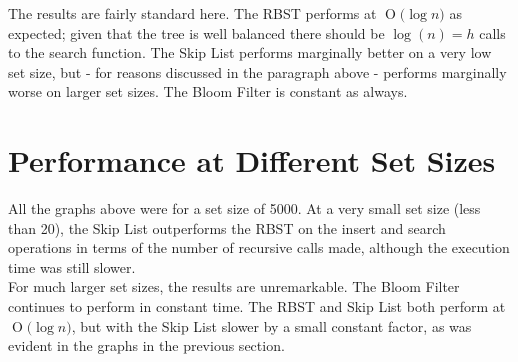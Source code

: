 \documentclass[11pt, notitlepage]{report}
\newcommand{\BigO}[1]{\ensuremath{\operatorname{O}\bigl(#1\bigr)}}
\begin{document}
The results are fairly standard here. The RBST performs at \BigO{\log n} as expected; given that the tree is well balanced there should be $\log(n) = h$ calls to the search function. The Skip List performs marginally better on a very low set size, but - for reasons discussed in the paragraph above - performs marginally worse on larger set sizes. The Bloom Filter is constant as always. 


\section*{Performance at Different Set Sizes}

All the graphs above were for a set size of 5000. At a very small set size (less than 20), the Skip List outperforms the RBST on the insert and search operations in terms of the number of recursive calls made, although the execution time was still slower.\\

For much larger set sizes, the results are unremarkable. The Bloom Filter continues to perform in constant time. The RBST and Skip List both perform at \BigO{\log n}, but with the Skip List slower by a small constant factor, as was evident in the graphs in the previous section.
\end{document}
